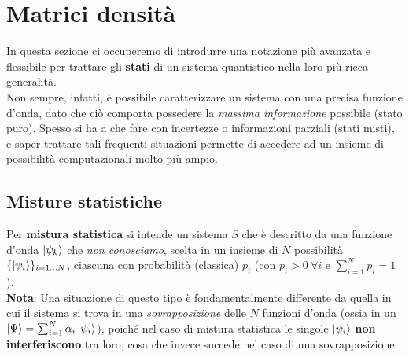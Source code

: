 \documentclass[../../InformazioneQuantistica.tex]{subfiles}
\begin{document}


\section{Matrici densità}
In questa sezione ci occuperemo di introdurre una notazione più avanzata e flessibile per trattare gli \textbf{stati} di un sistema quantistico nella loro più ricca generalità.\\
Non sempre, infatti, è possibile caratterizzare un sistema con una precisa funzione d'onda, dato che ciò comporta possedere la \textit{massima informazione} possibile (stato puro). Spesso si ha a che fare con incertezze o informazioni parziali (stati misti), e saper trattare tali frequenti situazioni permette di accedere ad un insieme di possibilità computazionali molto più ampio.

\subsection{Misture statistiche}
Per \textbf{mistura statistica} si intende un sistema $S$ che è descritto da una funzione d'onda $\Ket{\psi_k}$ che \textit{non conosciamo}, scelta in un insieme di $N$ possibilità $\{\Ket{\psi_i}\}_{i=1\dots N}$, ciascuna con probabilità (classica) $p_i$ (con $p_i > 0 \> \forall i$ e $\sum_{i=1}^N p_i = 1$).\\

\textbf{Nota}: Una situazione di questo tipo è fondamentalmente differente da quella in cui il sistema si trova in una \textit{sovrapposizione} delle $N$ funzioni d'onda (ossia in un $\Ket{\Psi} = \sum_{i=1}^N \alpha_i \Ket{\psi_i}$), poiché nel caso di mistura statistica le singole $\Ket{\psi_i}$ \textbf{non interferiscono} tra loro, cosa che invece succede nel caso di una sovrapposizione.\\
\end{document}
